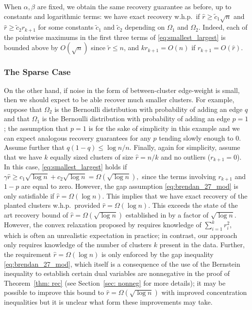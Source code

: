 \documentclass[twoside,11pt]{article}
\newcommand{\0}{\bs{0}}
\newcommand{\ra}{\rightarrow}
\begin{document}
{When \( \alpha, \beta \) are fixed, we obtain the same recovery guarantee as before, up to constants and logarithmic
terms:  we have exact recovery w.h.p.~if \(\hat r \ge \tilde c_1 \sqrt{n} \) and \(\hat r \ge \tilde c_2 r_{k+1} \)
for some constants \(\tilde c_1\) and \(\tilde c_2\) depending on \(\Omega_1\) and \(\Omega_2\).
Indeed, each of the pointwise maximums in the first  three terms
of \eqref{eq:smallest_largest} is bounded above by $O(\sqrt{n})$
since $\tilde r \le n$, and $k r_{k+1} = O(n)$ if $r_{k+1} = O(\hat r)$.

\subsubsection{The Sparse Case}


On the other hand, if noise in the form of between-cluster
edge-weight is small, then we
should expect to be able recover
much smaller clusters.
For example, suppose that \(\Omega_2\) is the Bernoulli distribution with probability of adding an edge \(q\) and that \(\Omega_1\) is the Bernoulli distribution with probability of adding an edge \(p=1\); the assumption that \(p=1\) is for the sake of simplicity in this example and we can expect analogous recovery guarantees for
any \(p\) tending slowly enough to \(0\).
Assume further that
\(
q (1-q)  \le {\log n }/{n}.
\)
Finally, again for simplicity, assume that we have \(k\) equally sized clusters of size \(\hat r = n/k\)
and no outliers (\(r_{k+1} = 0\)).
In this case, \eqref{eq:smallest_largest}
holds if
$
\gamma \hat r \ge c_1 \sqrt{\log n} + c_2 \sqrt{\log n}
= \Omega(\sqrt{\log n} ),
$
since the terms involving \(r_{k+1}\) and \(1-p\) are equal to zero.
However, the gap assumption \eqref{eq:brendan_27_mod} is only
satisfiable if $\hat r = \Omega(\log n)$.
This implies that we have exact recovery of the planted clusters
w.h.p.~provided $\hat r =\Omega(\log n)$. This exceeds the
state of the art recovery bound
of $\hat r = \Omega(\sqrt{\log n})$ established in \cite{jalali2015relative}
by a factor of $\sqrt{\log n}$.
However, the convex relaxation proposed by
\cite{jalali2015relative} requires knowledge
of $\sum_{i=1}^k r_i^2$, which is often an unrealistic
expectation in practice;
in contrast, our approach only requires knowledge
of the number of clusters $k$ present in the data.
Further,  the requirement $\hat r = \Omega(\log n)$
is only enforced by the gap inequality \eqref{eq:brendan_27_mod},
which itself is a consequence of the use of the Bernstein inequality
to establish certain dual variables are nonnegative
in the proof of Theorem~\ref{thm: rec} (see Section~\ref{sec: nonneg}
for more details); it may be possible to improve this bound
to $\hat r = \Omega(\sqrt{\log n})$ with improved concentration
inequalities
 but it is unclear
what form these improvements may take.


}
\end{document}
